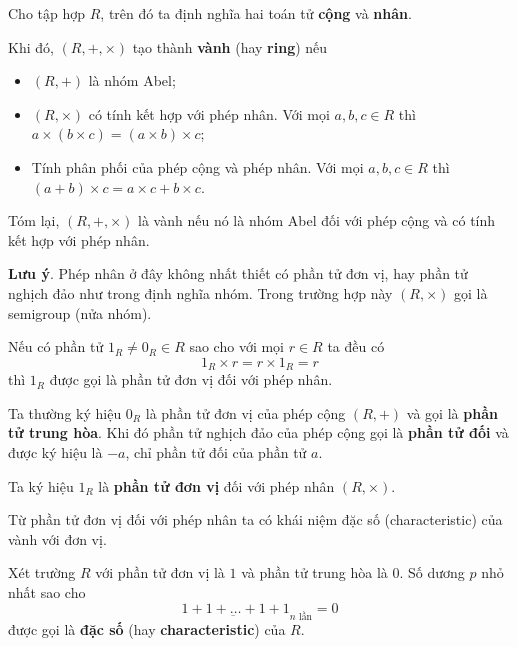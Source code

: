 \begin{definition}
    Cho tập hợp $R$, trên đó ta định nghĩa hai toán tử \textbf{cộng} và \textbf{nhân}.

    Khi đó, $(R, +, \times)$ tạo thành \textbf{vành} (hay \textbf{ring}) nếu

    \begin{itemize}
        \item $(R, +)$ là nhóm Abel;
        \item $(R, \times)$ có tính kết hợp với phép nhân. Với mọi $a, b, c \in R$ thì $a \times (b \times c) = (a \times b) \times c$;
        \item Tính phân phối của phép cộng và phép nhân. Với mọi $a, b, c \in R$ thì $(a + b) \times c = a \times c + b \times c$.
    \end{itemize}
\end{definition}

Tóm lại, $(R, +, \times)$ là vành nếu nó là nhóm Abel đối với phép cộng và có tính kết hợp với phép nhân.

\textbf{Lưu ý}. Phép nhân ở đây không nhất thiết có phần tử đơn vị, hay phần tử nghịch đảo như trong định nghĩa nhóm. Trong trường hợp này $(R, \times)$ gọi là semigroup (nửa nhóm).

\begin{definition} 
    Nếu có phần tử $1_R \neq 0_R \in R$ sao cho với mọi $r \in R$ ta đều có
    \begin{equation*}
        1_R \times r = r \times 1_R = r
    \end{equation*}
    thì $1_R$ được gọi là phần tử đơn vị đối với phép nhân.
\end{definition}

Ta thường ký hiệu $0_R$ là phần tử đơn vị của phép cộng $(R, +)$ và gọi là \textbf{phần tử trung hòa}.
Khi đó phần tử nghịch đảo của phép cộng gọi là \textbf{phần tử đối} và được ký hiệu là $-a$, chỉ phần tử đối của phần tử $a$.

Ta ký hiệu $1_R$ là \textbf{phần tử đơn vị} đối với phép nhân $(R, \times)$.

Từ phần tử đơn vị đối với phép nhân ta có khái niệm đặc số (characteristic) của vành với đơn vị.

\begin{definition}
    Xét trường $R$ với phần tử đơn vị là $1$ và phần tử trung hòa là 0. Số dương $p$ nhỏ nhất sao cho
    \begin{equation*}
        \underbar{1 + 1 + \ldots + 1 + 1}_{n \text{ lần}} = 0
    \end{equation*}
    được gọi là \textbf{đặc số} (hay \textbf{characteristic}) của $R$.
\end{definition}

